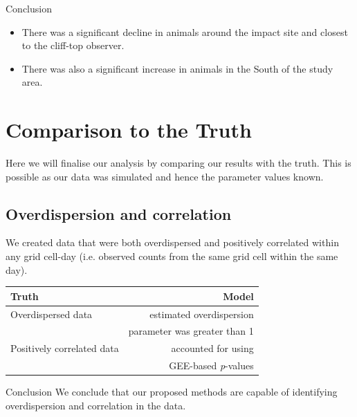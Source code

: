 \documentclass[11pt, a4paper]{article}
\begin{document}
\begin{block}{Conclusion}
 \begin{itemize}
  \item There was a significant decline in animals around the impact site and closest to the cliff-top observer.
  \item There was also a significant increase in animals in the South of the study area.
\end{itemize}
\end{block}

\pagebreak
\section{Comparison to the Truth}
Here we will finalise our analysis by comparing our results with the truth. This is possible as our data was simulated and hence the parameter values known. 
\subsection{Overdispersion and correlation}
We created data that were both overdispersed and positively correlated within any grid cell-day (i.e. observed counts from the same grid cell within the same day). 
\begin{table}[h!]
\begin{tabular}{l|r}
\textbf{Truth} & \textbf{Model}\\
\hline
Overdispersed  data & estimated overdispersion \\
 & parameter was greater than 1\\
\hline
Positively correlated data & accounted for using\\
 & GEE-based \textit{p}-values\\
\end{tabular}\end{table}
\begin{block}{Conclusion}
We conclude that our proposed methods are capable of identifying overdispersion and correlation in the data.
\end{block}
\end{document}
